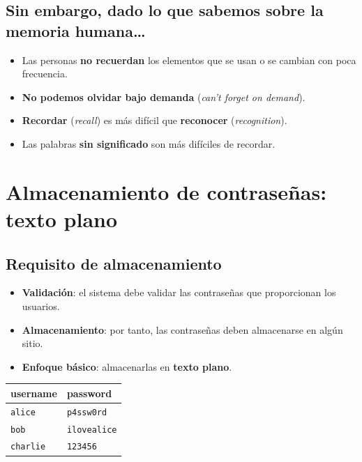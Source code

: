 \documentclass[11pt,a4paper]{report}
\begin{document}
\subsection{Sin embargo, dado lo que sabemos sobre la memoria humana\ldots}
\begin{itemize}
  \item Las personas \textbf{no recuerdan} los elementos que se usan o se cambian con poca frecuencia.
  \item \textbf{No podemos olvidar bajo demanda} (\emph{can't forget on demand}).
  \item \textbf{Recordar} (\emph{recall}) es más difícil que \textbf{reconocer} (\emph{recognition}).
  \item Las palabras \textbf{sin significado} son más difíciles de recordar.
\end{itemize}
 
\section{Almacenamiento de contraseñas: texto plano}
 
\subsection{Requisito de almacenamiento}
\begin{itemize}
  \item \textbf{Validación}: el sistema debe validar las contraseñas que proporcionan los usuarios.
  \item \textbf{Almacenamiento}: por tanto, las contraseñas deben almacenarse en algún sitio.
  \item \textbf{Enfoque básico}: almacenarlas en \textbf{texto plano}.
\end{itemize}
 
\begin{center}
\small
{\renewcommand{\arraystretch}{1.2}%
\begin{tabular}{l l}
\toprule
\textbf{username} & \textbf{password} \\
\midrule
\texttt{alice}   & \texttt{p4ssw0rd} \\
\texttt{bob}     & \texttt{ilovealice} \\
\texttt{charlie} & \texttt{123456} \\
\bottomrule
\end{tabular}}
\end{center}
 
\end{document}
